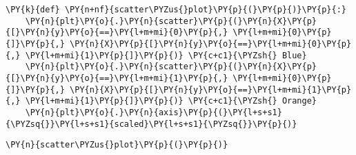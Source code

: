     \begin{tcolorbox}[breakable, size=fbox, boxrule=1pt, pad at break*=1mm,colback=cellbackground, colframe=cellborder]
\begin{Verbatim}[commandchars=\\\{\}]
\PY{k}{def} \PY{n+nf}{scatter\PYZus{}plot}\PY{p}{(}\PY{p}{)}\PY{p}{:}
    \PY{n}{plt}\PY{o}{.}\PY{n}{scatter}\PY{p}{(}\PY{n}{X}\PY{p}{[}\PY{n}{y}\PY{o}{==}\PY{l+m+mi}{0}\PY{p}{,} \PY{l+m+mi}{0}\PY{p}{]}\PY{p}{,} \PY{n}{X}\PY{p}{[}\PY{n}{y}\PY{o}{==}\PY{l+m+mi}{0}\PY{p}{,} \PY{l+m+mi}{1}\PY{p}{]}\PY{p}{)} \PY{c+c1}{\PYZsh{} Blue}
    \PY{n}{plt}\PY{o}{.}\PY{n}{scatter}\PY{p}{(}\PY{n}{X}\PY{p}{[}\PY{n}{y}\PY{o}{==}\PY{l+m+mi}{1}\PY{p}{,} \PY{l+m+mi}{0}\PY{p}{]}\PY{p}{,} \PY{n}{X}\PY{p}{[}\PY{n}{y}\PY{o}{==}\PY{l+m+mi}{1}\PY{p}{,} \PY{l+m+mi}{1}\PY{p}{]}\PY{p}{)} \PY{c+c1}{\PYZsh{} Orange}
    \PY{n}{plt}\PY{o}{.}\PY{n}{axis}\PY{p}{(}\PY{l+s+s1}{\PYZsq{}}\PY{l+s+s1}{scaled}\PY{l+s+s1}{\PYZsq{}}\PY{p}{)}
\end{Verbatim}
\end{tcolorbox}

    \begin{tcolorbox}[breakable, size=fbox, boxrule=1pt, pad at break*=1mm,colback=cellbackground, colframe=cellborder]
\begin{Verbatim}[commandchars=\\\{\}]
\PY{n}{scatter\PYZus{}plot}\PY{p}{(}\PY{p}{)}
\end{Verbatim}
\end{tcolorbox}

    \begin{center}
    \end{center}
    { \hspace*{\fill} \\}
    
